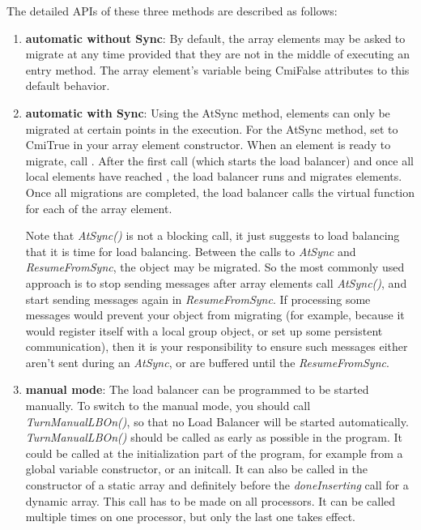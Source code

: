 The detailed APIs of these three methods are described as follows:
\begin{enumerate}

\item {\bf automatic without Sync}: By default, the array elements may be asked to migrate at any time
provided that they are not in the middle of executing an entry method. 
The array element's variable  being CmiFalse attributes
to this default behavior. 

\item {\bf automatic with Sync}: Using the AtSync method, elements can 
only be migrated at certain points in the execution. For the AtSync method, 
set  to CmiTrue in your 
array element constructor.  When an element is ready to migrate,
call .  
After the first  call (which starts the load balancer)
and once all local elements have reached ,
the load balancer runs and migrates elements.  Once
all migrations are completed, the load balancer calls the 
virtual function  for each of the
array element.  

Note that {\em AtSync()} is not a blocking call, it just suggests to load 
balancing that it is time for load balancing. Between the calls to 
{\em AtSync} and {\em ResumeFromSync}, the object
may be migrated. So the most commonly used approach is to stop sending
messages after array elements call {\em AtSync()}, and start sending
messages again in {\em ResumeFromSync}.
If processing some messages would prevent your object
from migrating (for example, because it would register itself with
a local group object, or set up some persistent communication),
then it is your responsibility to ensure such messages either aren't
sent during an {\em AtSync}, or are buffered until the {\em ResumeFromSync}.

\item {\bf manual mode}: The load balancer can be programmed to be started
manually. To switch to the manual mode, you should call
{\em TurnManualLBOn()}, so that no Load Balancer will be started automatically.
{\em TurnManualLBOn()} should be called as early as possible in the
program. It could be called at the initialization part of the program, 
for example from a global variable constructor, or an initcall.
It can also be called in the constructor of a static array and
definitely before the {\em doneInserting} call for a dynamic array.  This call 
has to be made on all processors. It can be called multiple times on one 
processor, but only the last one takes effect.   


\end{enumerate}
